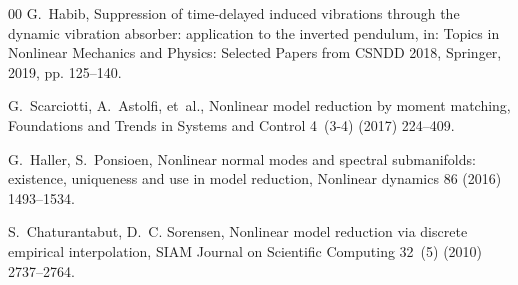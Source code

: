 \documentclass[preprint,12pt]{elsarticle}
\begin{document}
\begin{thebibliography}{00}
		G.~Habib, Suppression of time-delayed induced vibrations through the dynamic
		vibration absorber: application to the inverted pendulum, in: Topics in
		Nonlinear Mechanics and Physics: Selected Papers from CSNDD 2018, Springer,
		2019, pp. 125--140.
		
		G.~Scarciotti, A.~Astolfi, et~al., Nonlinear model reduction by moment
		matching, Foundations and Trends{\textregistered} in Systems and Control
		4~(3-4) (2017) 224--409.
		
		G.~Haller, S.~Ponsioen, Nonlinear normal modes and spectral submanifolds:
		existence, uniqueness and use in model reduction, Nonlinear dynamics 86
		(2016) 1493--1534.
		
		S.~Chaturantabut, D.~C. Sorensen, Nonlinear model reduction via discrete
		empirical interpolation, SIAM Journal on Scientific Computing 32~(5) (2010)
		2737--2764.
		
	\end{thebibliography}
	
\end{document}
